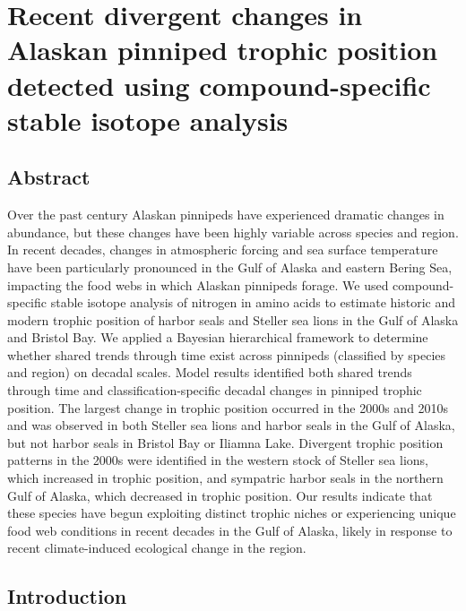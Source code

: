 \documentclass [11pt, proquest] {uwthesis}[2015/03/03]
\begin{document}
\chapter{Recent divergent changes in Alaskan pinniped trophic position
detected using compound-specific stable isotope
analysis}\label{recent-divergent-changes-in-alaskan-pinniped-trophic-position-detected-using-compound-specific-stable-isotope-analysis}

\section{Abstract}\label{abstract-2}

Over the past century Alaskan pinnipeds have experienced dramatic
changes in abundance, but these changes have been highly variable across
species and region. In recent decades, changes in atmospheric forcing
and sea surface temperature have been particularly pronounced in the
Gulf of Alaska and eastern Bering Sea, impacting the food webs in which
Alaskan pinnipeds forage. We used compound-specific stable isotope
analysis of nitrogen in amino acids to estimate historic and modern
trophic position of harbor seals and Steller sea lions in the Gulf of
Alaska and Bristol Bay. We applied a Bayesian hierarchical framework to
determine whether shared trends through time exist across pinnipeds
(classified by species and region) on decadal scales. Model results
identified both shared trends through time and classification-specific
decadal changes in pinniped trophic position. The largest change in
trophic position occurred in the 2000s and 2010s and was observed in
both Steller sea lions and harbor seals in the Gulf of Alaska, but not
harbor seals in Bristol Bay or Iliamna Lake. Divergent trophic position
patterns in the 2000s were identified in the western stock of Steller
sea lions, which increased in trophic position, and sympatric harbor
seals in the northern Gulf of Alaska, which decreased in trophic
position. Our results indicate that these species have begun exploiting
distinct trophic niches or experiencing unique food web conditions in
recent decades in the Gulf of Alaska, likely in response to recent
climate-induced ecological change in the region.

\section{Introduction}\label{introduction-3}
\end{document}
